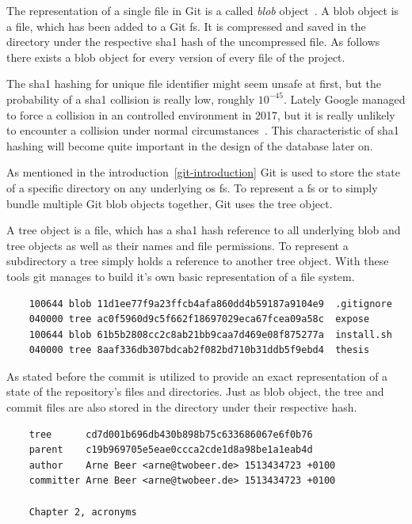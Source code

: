 The representation of a single file in Git is a called \emph{blob} object~\cite[p.~56]{book:pro-git}.
A blob object is a file, which has been added to a Git \ac{fs}.
It is compressed and saved in the  directory under the respective \ac{sha1} hash of the uncompressed file.
As follows there exists a blob object for every version of every file of the project.

The \ac{sha1} hashing for unique file identifier might seem unsafe at first, but the probability of a \ac{sha1} collision is really low, roughly $10^{-45}$.
Lately Google managed to force a collision in an controlled environment in 2017, but it is really unlikely to encounter a collision under normal circumstances~\cite{techreport:sha-collision}.
This characteristic of \ac{sha1} hashing will become quite important in the design of the database later on.

As mentioned in the introduction~\ref{git-introduction} Git is used to store the state of a specific directory on any underlying \ac{os} \ac{fs}.
To represent a \ac{fs} or to simply bundle multiple Git blob objects together, Git uses the tree object.

A tree object is a file, which has a \ac{sha1} hash reference to all underlying blob and tree objects as well as their names and file permissions.
To represent a subdirectory a tree simply holds a reference to another tree object.
With these tools git manages to build it's own basic representation of a file system.

\begin{verbatim}
    100644 blob 11d1ee77f9a23ffcb4afa860dd4b59187a9104e9  .gitignore
    040000 tree ac0f5960d9c5f662f18697029eca67fcea09a58c  expose
    100644 blob 61b5b2808cc2c8ab21bb9caa7d469e08f875277a  install.sh
    040000 tree 8aaf336db307bdcab2f082bd710b31ddb5f9ebd4  thesis
\end{verbatim}
\begingroup
{}
\endgroup

As stated before the commit is utilized to provide an exact representation of a state of the repository's files and directories.
Just as blob object, the tree and commit files are also stored in the  directory under their respective hash.

\begin{verbatim}
    tree      cd7d001b696db430b898b75c633686067e6f0b76
    parent    c19b969705e5eae0ccca2cde1d8a98be1a1eab4d
    author    Arne Beer <arne@twobeer.de> 1513434723 +0100
    committer Arne Beer <arne@twobeer.de> 1513434723 +0100

    Chapter 2, acronyms
\end{verbatim}
\begingroup
{}
\endgroup

